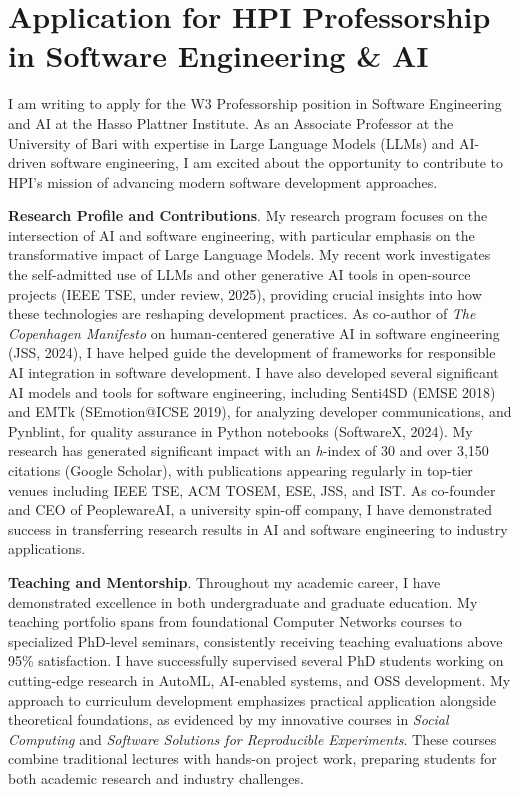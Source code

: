 \section{Application for HPI Professorship in Software Engineering \& AI}

I am writing to apply for the W3 Professorship position in Software Engineering and AI at the Hasso Plattner Institute.
As an Associate Professor at the University of Bari with expertise in Large Language Models (LLMs) and AI-driven software engineering, I am excited about the opportunity to contribute to HPI's mission of advancing modern software development approaches.

\textbf{Research Profile and Contributions}.
My research program focuses on the intersection of AI and software engineering, with particular emphasis on the transformative impact of Large Language Models.
My recent work investigates the self-admitted use of LLMs and other generative AI tools in open-source projects (IEEE TSE, under review, 2025), providing crucial insights into how these technologies are reshaping development practices. 
As co-author of \textit{The Copenhagen Manifesto} on human-centered generative AI in software engineering (JSS, 2024), I have helped guide the development of frameworks for responsible AI integration in software development. 
I have also developed several significant AI models and tools for software engineering, including Senti4SD (EMSE 2018) and EMTk (SEmotion@ICSE 2019), for analyzing developer communications, and Pynblint, for quality assurance in Python notebooks (SoftwareX, 2024).
My research has generated significant impact with an \textit{h}-index of 30 and over 3,150 citations (Google Scholar), with publications appearing regularly in top-tier venues including IEEE TSE, ACM TOSEM, ESE, JSS, and IST.
As co-founder and CEO of PeoplewareAI, a university spin-off company, I have demonstrated success in transferring research results in AI and software engineering to industry applications. 

\textbf{Teaching and Mentorship}.
Throughout my academic career, I have demonstrated excellence in both undergraduate and graduate education. 
My teaching portfolio spans from foundational Computer Networks courses to specialized PhD-level seminars, consistently receiving teaching evaluations above 95\% satisfaction. 
I have successfully supervised several PhD students working on cutting-edge research in AutoML, AI-enabled systems, and OSS development. 
My approach to curriculum development emphasizes practical application alongside theoretical foundations, as evidenced by my innovative courses in \textit{Social Computing} and \textit{Software Solutions for Reproducible Experiments}.
These courses combine traditional lectures with hands-on project work, preparing students for both academic research and industry challenges.

